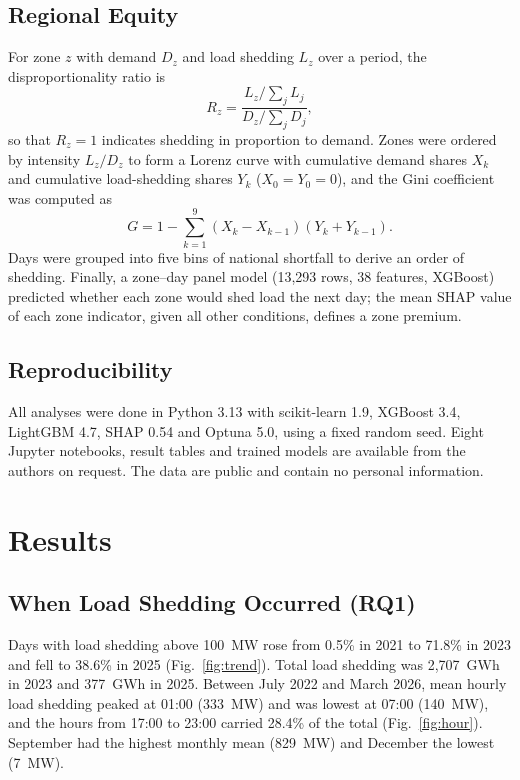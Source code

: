\documentclass[conference]{IEEEtran}
\begin{document}
\subsection{Regional Equity}
For zone $z$ with demand $D_z$ and load shedding $L_z$ over a period, the disproportionality ratio is
\begin{equation}
R_z = \frac{L_z / \sum_j L_j}{D_z / \sum_j D_j}, \label{eq:ratio}
\end{equation}
so that $R_z = 1$ indicates shedding in proportion to demand. Zones were ordered by intensity $L_z/D_z$ to form a Lorenz curve with cumulative demand shares $X_k$ and cumulative load-shedding shares $Y_k$ ($X_0 = Y_0 = 0$), and the Gini coefficient~\cite{heylen2018} was computed as
\begin{equation}
G = 1 - \sum_{k=1}^{9} (X_k - X_{k-1})(Y_k + Y_{k-1}). \label{eq:gini}
\end{equation}
Days were grouped into five bins of national shortfall to derive an order of shedding. Finally, a zone--day panel model (13,293 rows, 38 features, XGBoost) predicted whether each zone would shed load the next day; the mean SHAP value of each zone indicator, given all other conditions, defines a zone premium.

\subsection{Reproducibility}
All analyses were done in Python 3.13 with scikit-learn 1.9, XGBoost 3.4, LightGBM 4.7, SHAP 0.54 and Optuna 5.0, using a fixed random seed. Eight Jupyter notebooks, result tables and trained models are available from the authors on request. The data are public and contain no personal information.

\section{Results}\label{sec:results}
\subsection{When Load Shedding Occurred (RQ1)}
Days with load shedding above 100~MW rose from 0.5\% in 2021 to 71.8\% in 2023 and fell to 38.6\% in 2025 (Fig.~\ref{fig:trend}). Total load shedding was 2,707~GWh in 2023 and 377~GWh in 2025. Between July 2022 and March 2026, mean hourly load shedding peaked at 01:00 (333~MW) and was lowest at 07:00 (140~MW), and the hours from 17:00 to 23:00 carried 28.4\% of the total (Fig.~\ref{fig:hour}). September had the highest monthly mean (829~MW) and December the lowest (7~MW).
\end{document}
